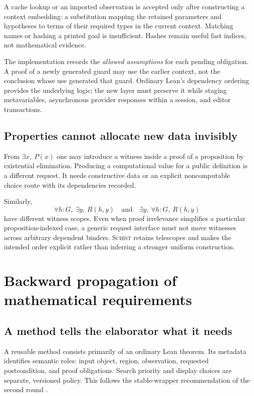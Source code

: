 \documentclass[11pt,a4paper]{article}
\newcommand{\Schist}{\textsc{Schist}}
\theoremstyle{definition}
\begin{document}
A cache lookup or an imported observation is accepted only after constructing
a context embedding: a substitution mapping the retained parameters and
hypotheses to terms of their required types in the current context. Matching
names or hashing a printed goal is insufficient. Hashes remain useful fast
indices, not mathematical evidence.

The implementation records the \emph{allowed assumptions} for each pending
obligation. A proof of a newly generated guard may use the earlier context,
not the conclusion whose use generated that guard. Ordinary Lean's dependency
ordering provides the underlying logic; the new layer must preserve it while
staging metavariables, asynchronous provider responses within a session, and
editor transactions.

\subsection{Properties cannot allocate new data invisibly}
From $\exists x,\ P(x)$ one may introduce a witness inside a proof of a
proposition by existential elimination. Producing a computational value for a
public definition is a different request. It needs constructive data or an
explicit noncomputable choice route with its dependencies recorded.

Similarly,
\[
 \forall h:G,\ \exists y,\ R(h,y)
 \quad\text{and}\quad
 \exists y,\ \forall h:G,\ R(h,y)
\]
have different witness scopes. Even when proof irrelevance simplifies a
particular proposition-indexed case, a generic request interface must not move
witnesses across arbitrary dependent binders. \Schist{} retains telescopes and
makes the intended order explicit rather than inferring a stronger uniform
construction.

\section{Backward propagation of mathematical requirements}\label{sec:requirements}
\subsection{A method tells the elaborator what it needs}
A reusable method consists primarily of an ordinary Lean theorem. Its metadata
identifies semantic roles: input object, region, observation, requested
postcondition, and proof obligations. Search priority and display choices are
separate, versioned policy. This follows the stable-wrapper recommendation of
the second round \cite{round2a,round2b}.
\end{document}
